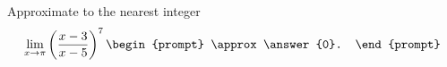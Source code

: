 \documentclass{ximera}
\author{Gregory Hartman \and Matthew Carr}
\begin{document}
\begin{exercise}




Approximate to the nearest integer
\[
\lim_{x\to\pi}\left({\frac{x-3}{x-5}}\right)^7
\begin{prompt}
\approx \answer{0}.
\end{prompt}
\]

\end{exercise}
\end{document}
